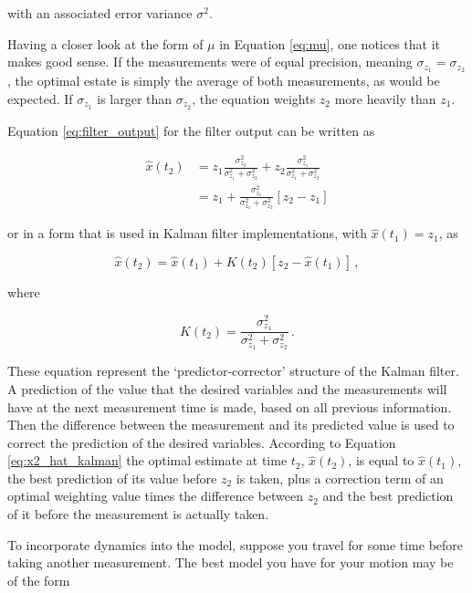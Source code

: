 \noindent
with an associated error variance $\sigma^2$.

Having a closer look at the form of $\mu$ in Equation \ref{eq:mu}, one notices that it makes good sense. If the measurements were of equal precision, meaning $\sigma_{z_1}=\sigma_{z_2}$, the optimal estate is simply the average of both measurements, as would be expected. If $\sigma_{z_1}$ is larger than $\sigma_{z_2}$, the equation weights $z_2$ more heavily than $z_1$.

Equation \ref{eq:filter_output} for the filter output can be written as

\begin{equation}\label{eq:x2_hat}
\begin{split}
  \hat{x}(t_2) & =z_1\frac{\sigma^2_{z_2}}{\sigma^2_{z_1}+\sigma^2_{z_2}}+z_2\frac{\sigma^2_{z_1}}{\sigma^2_{z_1}+\sigma^2_{z_2}} \\
  & =z_1+\frac{\sigma^2_{z_1}}{\sigma^2_{z_1}+\sigma^2_{z_2}}[z_2-z_1]
\end{split}
\end{equation}

\noindent
or in a form that is used in Kalman filter implementations, with $\hat{x}(t_1)=z_1$, as

\begin{equation}\label{eq:x2_hat_kalman}
  \hat{x}(t_2) = \hat{x}(t_1) + K(t_2)[z_2-\hat{x}(t_1)]\,,
\end{equation}

\noindent
where

\begin{equation}\label{}
  K(t_2) = \frac{\sigma^2_{z_1}}{\sigma^2_{z_1}+\sigma^2_{z_2}}\,.
\end{equation}

\noindent
These equation represent the `predictor-corrector' structure of the Kalman filter. A prediction of the value that the desired variables and the measurements will have at the next measurement time is made, based on all previous information. Then the difference between the measurement and its predicted value is used to correct the prediction of the desired variables. According to Equation \ref{eq:x2_hat_kalman} the optimal estimate at time $t_2$, $\hat{x}(t_2)$, is equal to $\hat{x}(t_1)$, the best prediction of its value before $z_2$ is taken, plus a correction term of an optimal weighting value times the difference between $z_2$ and the best prediction of it before the measurement is actually taken.

To incorporate dynamics into the model, suppose you travel for some time before taking another measurement. The best model you have for your motion may be of the form

